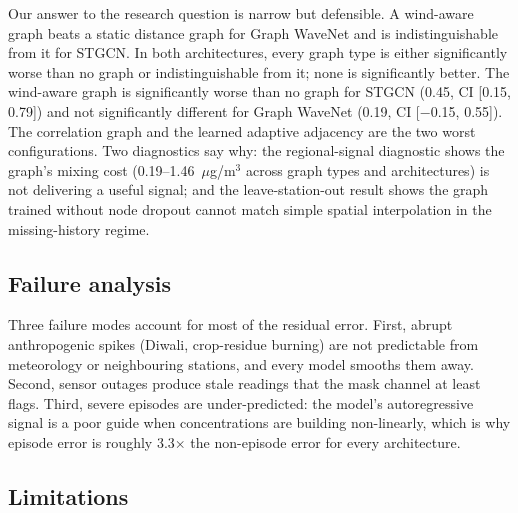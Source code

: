 \documentclass[11pt,a4paper]{article}
\begin{document}
Our answer to the research question is narrow but defensible.  A wind-aware
graph beats a static distance graph for Graph WaveNet and is indistinguishable
from it for STGCN.  In both architectures, every graph type is either
significantly worse than no graph or indistinguishable from it; none is
significantly better.  The wind-aware graph is significantly worse than no
graph for STGCN (0.45, CI [0.15, 0.79]) and not significantly different for
Graph WaveNet (0.19, CI [$-$0.15, 0.55]).  The correlation graph and the
learned adaptive adjacency are the two worst configurations.  Two diagnostics
say why: the regional-signal diagnostic shows the graph's mixing cost
(0.19--1.46~$\mu$g/m$^3$ across graph types and architectures) is not
delivering a useful signal; and the leave-station-out result shows the graph
trained without node dropout cannot match simple spatial interpolation in the
missing-history regime.

\subsection{Failure analysis}

Three failure modes account for most of the residual error.  First, abrupt
anthropogenic spikes (Diwali, crop-residue burning) are not predictable from
meteorology or neighbouring stations, and every model smooths them away.
Second, sensor outages produce stale readings that the mask channel at least
flags.  Third, severe episodes are under-predicted: the model's autoregressive
signal is a poor guide when concentrations are building non-linearly, which is
why episode error is roughly 3.3$\times$ the non-episode error for every
architecture.

\subsection{Limitations}
\end{document}
